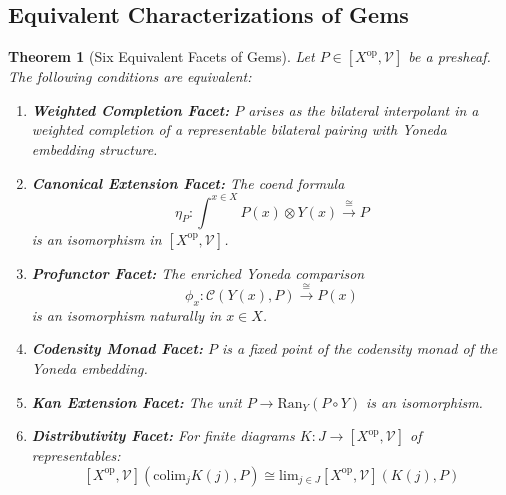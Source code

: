 \documentclass[11pt]{article}
\theoremstyle{plain}
\newtheorem{theorem}{Theorem}[section]
\theoremstyle{definition}
\theoremstyle{remark}
\newcommand{\V}{\mathcal{V}}
\newcommand{\C}{\mathcal{C}}
\newcommand{\op}{\mathrm{op}}
\newcommand{\colim}{\mathrm{colim}}
\renewcommand{\lim}{\mathrm{lim}}
\begin{document}
\subsection{Equivalent Characterizations of Gems}

\begin{theorem}[Six Equivalent Facets of Gems]\label{thm:gem-equivalences}
Let $P \in [X^{\op}, \V]$ be a presheaf. The following conditions are equivalent:

\begin{enumerate}
\item \textbf{Weighted Completion Facet:} $P$ arises as the bilateral interpolant in a weighted completion of a representable bilateral pairing with Yoneda embedding structure.

\item \textbf{Canonical Extension Facet:} The coend formula
$$\eta_P : \int^{x \in X} P(x) \otimes Y(x) \xrightarrow{\cong} P$$
is an isomorphism in $[X^{\op}, \V]$.

\item \textbf{Profunctor Facet:} The enriched Yoneda comparison
$$\phi_x : \C(Y(x), P) \xrightarrow{\cong} P(x)$$
is an isomorphism naturally in $x \in X$.

\item \textbf{Codensity Monad Facet:} $P$ is a fixed point of the codensity monad of the Yoneda embedding.

\item \textbf{Kan Extension Facet:} The unit $P \to \text{Ran}_Y(P \circ Y)$ is an isomorphism.

\item \textbf{Distributivity Facet:} For finite diagrams $K : J \to [X^{\op}, \V]$ of representables:
$$[X^{\op}, \V](\colim_j K(j), P) \cong \lim_{j \in J} [X^{\op}, \V](K(j), P)$$
\end{enumerate}
\end{theorem}
\end{document}
